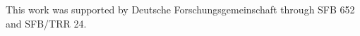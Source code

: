 \documentclass[aps,pra,twocolumn,showpacs,showkeys,10pt,nofootinbib]{revtex4-1}
\begin{document}
\begin{acknowledgments}

This work was supported by Deutsche Forschungsgemeinschaft through SFB 652 and SFB/TRR 24.

\end{acknowledgments}


%
\end{document}
